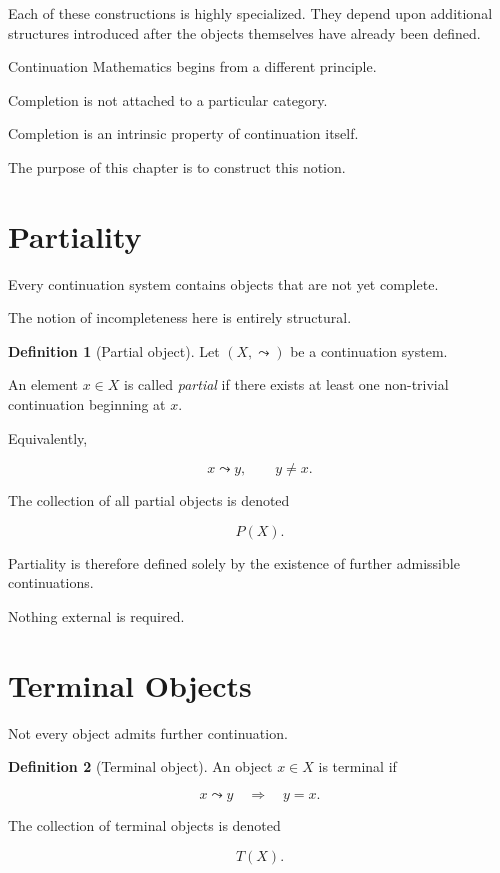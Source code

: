 \documentclass[13pt,openany]{book}
\theoremstyle{plain}
\theoremstyle{definition}
\newtheorem{definition}{Definition}[chapter]
\begin{document}
Each of these constructions is highly specialized.
They depend upon additional structures introduced after the objects themselves
have already been defined.

Continuation Mathematics begins from a different principle.

Completion is not attached to a particular category.

Completion is an intrinsic property of continuation itself.

The purpose of this chapter is to construct this notion.


\section{Partiality}

Every continuation system contains objects that are not yet complete.

The notion of incompleteness here is entirely structural.

\begin{definition}[Partial object]
Let $(X,\leadsto)$ be a continuation system.

An element $x\in X$ is called \emph{partial} if there exists at least one
non-trivial continuation beginning at $x$.

Equivalently,

\[
x\leadsto y,
\qquad
y\neq x.
\]

The collection of all partial objects is denoted

\[
P(X).
\]
\end{definition}

Partiality is therefore defined solely by the existence of further admissible
continuations.

Nothing external is required.


\section{Terminal Objects}

Not every object admits further continuation.

\begin{definition}[Terminal object]
An object $x\in X$ is terminal if

\[
x\leadsto y
\quad\Longrightarrow\quad
y=x.
\]

The collection of terminal objects is denoted

\[
T(X).
\]
\end{definition}
\end{document}
